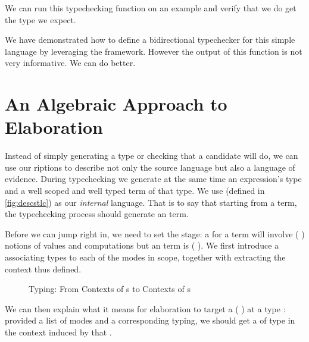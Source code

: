 We can run this typechecking function on an example and verify that we do get the type
we expect.


We have demonstrated how to define a bidirectional typechecker for this simple language
by leveraging the  framework. However the output of this function is not
very informative. We can do better.

\section{An Algebraic Approach to Elaboration}

Instead of simply generating a type or checking that a candidate will do, we can use our
riptions to describe not only the source language but also a language of evidence.
During typechecking we generate at the same time an expression's type and a well scoped and
well typed term of that type. We use  (defined in \cref{fig:descstlc}) as our
\emph{internal} language. That is to say that starting from a  term, the typechecking
process should generate an  term.

Before we can jump right in, we need to set the stage: a  for a 
term will involve ({ }) notions of values and computations but an
 term is ({ }). We first introduce a  associating
types to each of the modes in scope, together with  extracting the context
thus defined.

\begin{figure}[h]
\begin{minipage}{0.4\textwidth}
\end{minipage}
\begin{minipage}{0.6\textwidth}
\end{minipage}
\caption{Typing: From Contexts of s to Contexts of s\label{fig:typingmodes}}
\end{figure}

We can then explain what it means for elaboration to target  a
({ }) at a type : provided a list of modes and a corresponding
typing, we should get a  of type  in the context induced by that .

